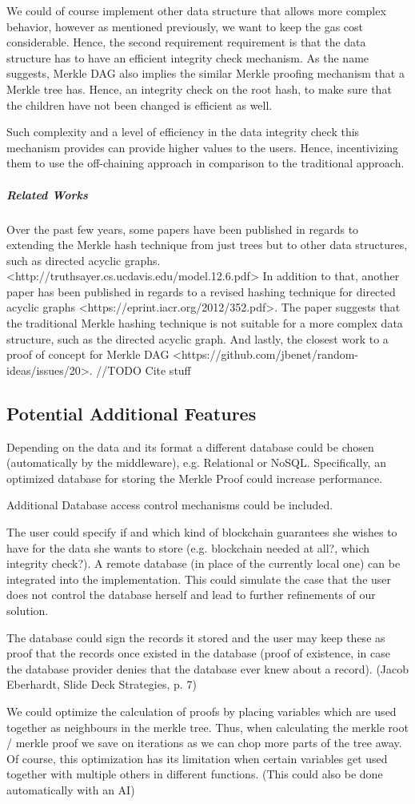 We could of course implement other data structure that allows more complex behavior, however as mentioned previously, we want to keep the gas cost considerable. Hence, the second requirement requirement is that the data structure has to have an efficient integrity check mechanism. As the name suggests, Merkle DAG also implies the similar Merkle proofing mechanism that a Merkle tree has. Hence, an integrity check on the root hash, to make sure that the children have not been changed is efficient as well.

Such complexity and a level of efficiency in the data integrity check this mechanism provides can provide higher values to the users. Hence, incentivizing them to use the off-chaining approach in comparison to the traditional approach.

\subparagraph{Related Works}
Over the past few years, some papers have been published in regards to extending the Merkle hash technique from just trees but to other data structures, such as directed acyclic graphs. <http://truthsayer.cs.ucdavis.edu/model.12.6.pdf> In addition to that, another paper has been published in regards to a revised hashing technique for directed acyclic graphs <https://eprint.iacr.org/2012/352.pdf>. The paper suggests that the traditional Merkle hashing technique is not suitable for a more complex data structure, such as the directed acyclic graph. And lastly, the closest work to a proof of concept for Merkle DAG <https://github.com/jbenet/random-ideas/issues/20>.  //TODO Cite stuff

\subsection{Potential Additional Features}
Depending on the data and its format a different database could be chosen (automatically by the middleware), e.g. Relational or NoSQL. Specifically, an optimized database for storing the Merkle Proof could increase performance.

Additional Database access control mechanisms could be included.

The user could specify if and which kind of blockchain guarantees she wishes to have for the data she wants to store (e.g. blockchain needed at all?, which integrity check?).
A remote database (in place of the currently local one) can be integrated into the implementation. This could simulate the case that the user does not control the database herself and lead to further refinements of our solution.

The database could sign the records it stored and the user may keep these as proof that the records once existed in the database (proof of existence, in case the database provider denies that the database ever knew about a record). (Jacob Eberhardt, Slide Deck Strategies, p. 7)

We could optimize the calculation of proofs by placing variables which are used together as neighbours in the merkle tree. Thus, when calculating the merkle root / merkle proof we save on iterations as we can chop more parts of the tree away. Of course, this optimization has its limitation when certain variables get used together with multiple others in different functions. (This could also be done automatically with an AI)
